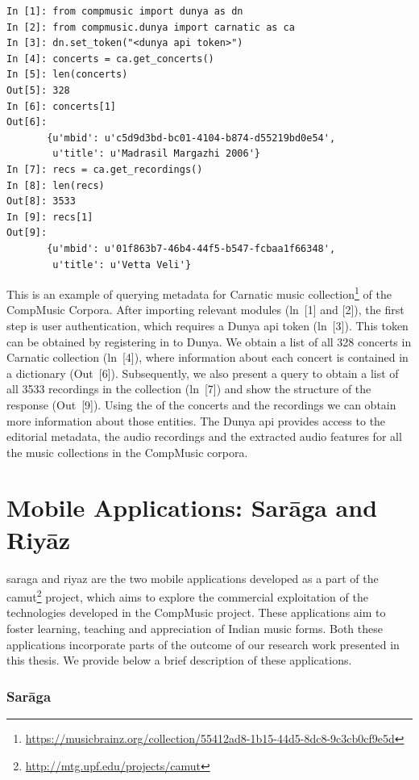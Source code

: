 \begin{verbatim}
In [1]: from compmusic import dunya as dn
In [2]: from compmusic.dunya import carnatic as ca
In [3]: dn.set_token("<dunya api token>")
In [4]: concerts = ca.get_concerts()
In [5]: len(concerts)
Out[5]: 328
In [6]: concerts[1]
Out[6]: 
       {u'mbid': u'c5d9d3bd-bc01-4104-b874-d55219bd0e54',
        u'title': u'Madrasil Margazhi 2006'}
In [7]: recs = ca.get_recordings()
In [8]: len(recs)
Out[8]: 3533
In [9]: recs[1]
Out[9]: 
       {u'mbid': u'01f863b7-46b4-44f5-b547-fcbaa1f66348',
        u'title': u'Vetta Veli'}        
\end{verbatim}
This is an example of querying metadata for Carnatic music collection\footnote{\url{https://musicbrainz.org/collection/55412ad8-1b15-44d5-8dc8-9c3cb0cf9e5d}} of the CompMusic Corpora. After importing relevant modules (ln~[1] and [2]), the first step is user authentication, which requires a Dunya \gls{api} token (ln~[3]). This token can be obtained by registering in to Dunya. We obtain a list of all 328 concerts in Carnatic collection (ln~[4]), where information about each concert is contained in a dictionary (Out~[6]). Subsequently, we also present a query to obtain a list of all 3533 recordings in the collection (ln~[7]) and show the structure of the response (Out~[9]). Using the  of the concerts and the recordings we can obtain more information about those entities. The Dunya \gls{api} provides access to the editorial metadata, the audio recordings and the extracted audio features for all the music collections in the CompMusic corpora.

\section{Mobile Applications: Sar\={a}ga and Riy\={a}z}
\label{sec:mobile_apps_camut}

\gls{saraga} and \gls{riyaz} are the two mobile applications developed as a part of the \gls{camut}\footnote{\url{http://mtg.upf.edu/projects/camut}} project, which aims to explore the commercial exploitation of the technologies developed in the CompMusic project. These applications aim to foster learning, teaching and appreciation of Indian music forms. Both these applications incorporate parts of the outcome of our research work presented in this thesis. We provide below a brief description of these applications. 

\subsubsection{Sar\={a}ga}
\label{sec:saraga}

